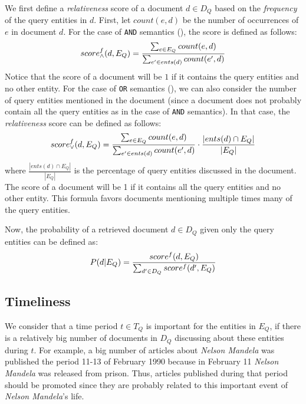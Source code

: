 We first define a {\em relativeness} score of a document $d \in D_Q$
based on the {\em frequency} of the query entities in $d$.
First, let $count(e, d)$ be the number of occurrences of $e$ in document $d$.
For the case of {\tt AND} semantics (\q{$\wedge$}),
the score is defined as follows:
\begin{equation}
\small
score^{f}_{\wedge}(d, E_Q) = \frac{\sum_{e \in E_Q}{count(e, d)}}{\sum_{e' \in ents(d)}{count(e', d)}}
\end{equation}
Notice that the score of a document will be $1$ if it contains the query entities and no other entity.
For the case of {\tt OR} semantics (\q{$\vee$}),
we can also consider the number of query entities mentioned in the document
(since a document does not probably contain all the query entities as in the case of {\tt AND} semantics).
In that case, the {\em relativeness} score can be defined as follows:
\begin{equation}
\small
score^{f}_{\vee}(d, E_Q) = \frac{\sum_{e \in E_Q}{count(e, d)}}{\sum_{e' \in ents(d)}{count(e', d)}} \cdot \frac{|ents(d) \cap E_Q|}{|E_Q|}
\end{equation}
where $\frac{|ents(d) \cap E_Q|}{|E_Q|}$ is the percentage of query entities discussed in the document.
The score of a document will be 1 if it contains all the query entities and no other entity.
This formula favors documents mentioning multiple times many of the query entities.

Now, the probability of a retrieved document $d \in D_Q$ given only the query entities can be defined as:
\begin{equation}
\small
P(d|E_Q) = \frac{score^{f}(d, E_Q)}{\sum_{d' \in D_Q}{score^{f}(d', E_Q)}}
\end{equation}


\subsection*{Timeliness}

We consider that a time period $t \in T_Q$ is important
for the entities in $E_Q$, if there is a relatively big number of documents in $D_Q$
discussing about these entities during $t$.
For example, a big number of articles about {\em Nelson Mandela}
was published the period 11-13 of February 1990 because
in February 11 {\em Nelson Mandela} was released from prison.
Thus, articles published during that period should be promoted since
they are probably related to this important event of {\em Nelson Mandela}'s life.

